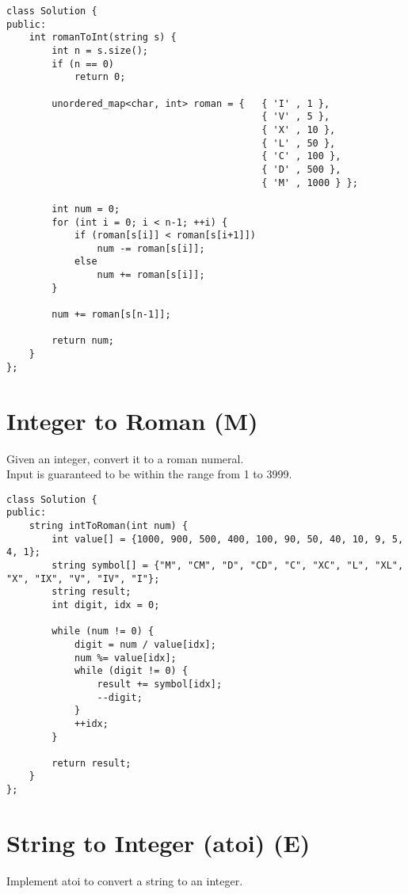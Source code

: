 \begin{lstlisting}
class Solution {
public:
    int romanToInt(string s) {
        int n = s.size();
        if (n == 0)
            return 0;

        unordered_map<char, int> roman = {   { 'I' , 1 },
                                             { 'V' , 5 },
                                             { 'X' , 10 },
                                             { 'L' , 50 },
                                             { 'C' , 100 },
                                             { 'D' , 500 },
                                             { 'M' , 1000 } };
                                         
        int num = 0;
        for (int i = 0; i < n-1; ++i) {
            if (roman[s[i]] < roman[s[i+1]])
                num -= roman[s[i]];
            else
                num += roman[s[i]];
        }
    
        num += roman[s[n-1]];
    
        return num;
    }
};
\end{lstlisting}   


\section{Integer to Roman (M)}
Given an integer, convert it to a roman numeral. \\

Input is guaranteed to be within the range from 1 to 3999.\\

\begin{lstlisting}
class Solution {
public:
    string intToRoman(int num) {
        int value[] = {1000, 900, 500, 400, 100, 90, 50, 40, 10, 9, 5, 4, 1};
        string symbol[] = {"M", "CM", "D", "CD", "C", "XC", "L", "XL", "X", "IX", "V", "IV", "I"};
        string result;
        int digit, idx = 0;
        
        while (num != 0) {
            digit = num / value[idx];
            num %= value[idx];
            while (digit != 0) {
                result += symbol[idx];
                --digit;
            }
            ++idx;
        }
        
        return result;
    }
};
\end{lstlisting}   


\section{String to Integer (atoi) (E)}
Implement atoi to convert a string to an integer. \\

